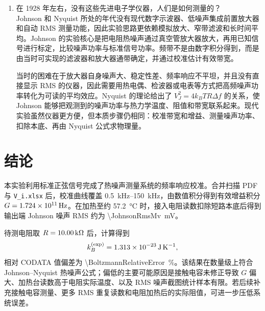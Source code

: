\documentclass[11pt]{article}
\begin{document}
\begin{enumerate}
    实际应用中难点在于 $V_J$ 很小，容易被放大器噪声、外界电磁干扰和带宽不确定性淹没。要把它做成精密温度计，需要低噪声前端、精确带宽校准、稳定屏蔽、充分平均以及对寄生电容的修正。本实验的结果已经体现出这种思想：温度进入公式的方式非常直接，但温度、带宽和本底中任何一个量的系统误差都会反映到最终 $k_B$ 或反推温度中。

    \item 在 1928 年左右，没有这些先进电子学仪器，人们是如何测量的？\\
    Johnson 和 Nyquist 所处的年代没有现代数字示波器、低噪声集成前置放大器和自动 RMS 测量功能，因此实验思路更依赖模拟放大、窄带滤波和长时间平均。Johnson 的实验核心是把电阻热噪声通过真空管放大器放大，再用已知信号进行标定，比较噪声功率与标准信号功率。频带不是由数字积分得到，而是由当时可实现的滤波器和放大器通带确定，并通过校准估计有效带宽。

    当时的困难在于放大器自身噪声大、稳定性差、频率响应不平坦，并且没有直接显示 RMS 的仪器，因此需要用热电偶、检波器或电表等方式把高频噪声功率转化为可读的平均效应。Nyquist 的理论给出了 $V_J^2=4k_BTR\Delta f$ 的关系，使 Johnson 能够把观测到的噪声功率与热力学温度、阻值和带宽联系起来。现代实验虽然仪器更方便，但本质步骤仍相同：校准带宽和增益、测量噪声功率、扣除本底、再由 Nyquist 公式求物理量。
\end{enumerate}

\section{结论}

本实验利用标准正弦信号完成了热噪声测量系统的频率响应校准。合并扫描 PDF 与 \texttt{V\_i.xlsx} 后，校准曲线覆盖 \SIrange{0.5}{150}{kHz}，由数值积分得到有效增益积分 $G=\SI{1.724e+11}{Hz}$。在加热至约 \SI{57.2}{\degreeCelsius} 时，接入电阻读数扣除短路本底后得到输出端 Johnson 噪声 RMS 约为 \SI{\JohnsonRmsMv}{mV}。

待测电阻取 $R=\SI{10.00}{k\ohm}$ 后，计算得到
\[
    k_B^{(\mathrm{exp})}=\SI{1.313e-23}{J.K^{-1}},
\]
相对 CODATA 值偏差为 \SI{\BoltzmannRelativeError}{\percent}。该结果在数量级上符合 Johnson--Nyquist 热噪声公式；偏低的主要可能原因是接触电容未修正导致 $G$ 偏大、加热台读数高于电阻实际温度、以及 RMS 噪声截图统计样本有限。若后续补充接触电容测量、更多 RMS 重复读数和电阻加热后的实际阻值，可进一步压低系统误差。
\end{document}
